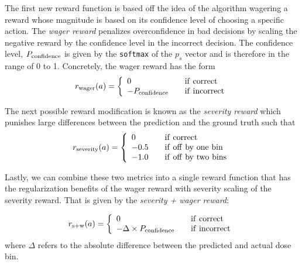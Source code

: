 \documentclass{article}
\begin{document}
The first new reward function is based off the idea of the algorithm wagering a reward whose magnitude is based on its confidence level of choosing a specific action. The \textit{wager reward} penalizes overconfidence in bad decisions by scaling the negative reward by the confidence level in the incorrect decision. The confidence level, $P_{\rm confidence}$ is given by the \verb|softmax| of the $p_s$ vector and is therefore in the range of 0 to 1. Concretely, the wager reward has the form 
\begin{equation}
    r_{\rm wager}(a) = \left \{ \begin{array}{ll}
    0 & \quad {\rm if \ correct} \\
    -P_{\rm confidence} & \quad {\rm if \ incorrect} \end{array} \right.
\end{equation}

The next possible reward modification is known as the \textit{severity reward} which punishes large differences between the prediction and the ground truth such that 
\begin{equation}
    r_{\rm severity}(a) = \left \{ \begin{array}{ll}
    0 & \quad {\rm if \ correct} \\
    -0.5 & \quad {\rm if \ off \ by \ one \ bin} \\
    -1.0 & \quad {\rm if \ off \ by \ two \ bins} \end{array} \right.
\end{equation}

Lastly, we can combine these two metrics into a single reward function that has the regularization benefits of the wager reward with severity scaling of the severity reward. That is given by the \textit{severity + wager reward}:

\begin{equation}
    r_{\rm s + w}(a) = \left \{ \begin{array}{ll}
    0 & \quad {\rm if \ correct} \\
    -\Delta \times P_{\rm confidence} & \quad {\rm if \ incorrect} \end{array} \right.
\end{equation}
where $\Delta$ refers to the absolute difference between the predicted and actual dose bin.
\end{document}
